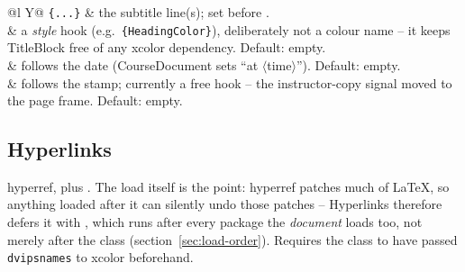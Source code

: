 \begin{center}
\begin{tabularx}{\linewidth}{@{}l Y@{}}
\texttt{\{...\}} & the subtitle line(s); set before
  .\\
 & a \emph{style} hook (e.g.\
  \texttt{\{HeadingColor\}}), deliberately not a colour name --
  it keeps TitleBlock free of any xcolor dependency. Default: empty.\\
\cs{TitleStamp} & follows the date (CourseDocument sets ``at
  $\langle$time$\rangle$''). Default: empty.\\
 & follows the stamp; currently a free hook -- the
  instructor-copy signal moved to the page frame. Default: empty.\\
\end{tabularx}
\end{center}

\subsection*{Hyperlinks}

hyperref, plus . The load itself is the point:
hyperref patches much of LaTeX, so anything loaded after it can silently
undo those patches -- Hyperlinks therefore defers it with
, which runs after every package the \emph{document}
loads too, not merely after the class
(section~\ref{sec:load-order}). Requires the class to have passed
\texttt{dvipsnames} to xcolor beforehand.

